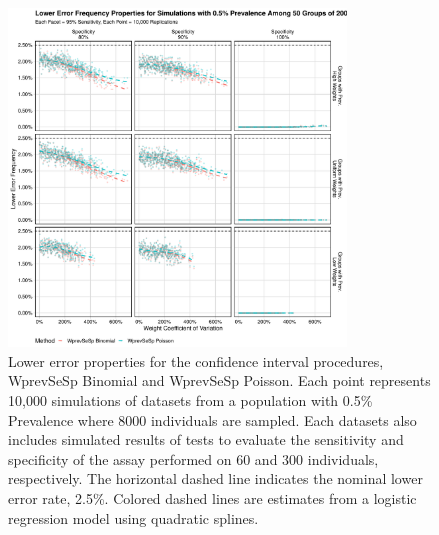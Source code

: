 \documentclass[AMA,STIX1COL]{WileyNJD-v2}
\begin{document}
\begin{figure}
\centering
\includegraphics[width=0.8\textwidth]{figures/imperfect_lower_error_frequency_50_groups_0_005_prev.pdf}
\caption{Lower error properties for the confidence interval procedures, WprevSeSp Binomial and WprevSeSp Poisson.
Each point represents 10,000 simulations of datasets from a population with 0.5\% Prevalence where 8000 individuals are sampled.
Each datasets also includes simulated results of tests to evaluate the sensitivity and specificity of the assay performed on 60 and 300 individuals, respectively.
The horizontal dashed line indicates the nominal lower error rate, 2.5\%.
Colored dashed lines are estimates from a logistic regression model using quadratic splines.}
\label{fig:imperfect_lower_error_frequency_50_groups_0_005_prev}
\end{figure}
\end{document}
